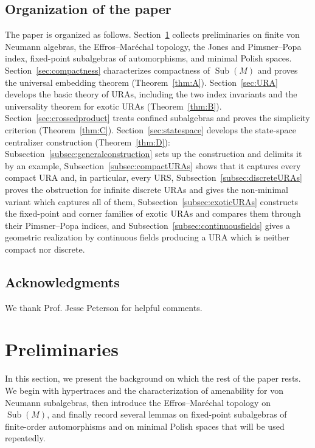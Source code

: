 \documentclass[12pt]{amsart} %
\theoremstyle{plain}
\theoremstyle{definition}
\DeclareMathOperator{\Sub}{Sub}
\begin{document}
\subsection*{Organization of the paper} The paper is organized as follows. Section~\ref{sec:preliminaries} collects preliminaries on finite von Neumann algebras, the Effros--Mar\'echal topology, the Jones and Pimsner--Popa index, fixed-point subalgebras of automorphisms, and minimal Polish spaces. Section~\ref{sec:compactness} characterizes compactness of $\Sub(M)$ and proves the universal embedding theorem (Theorem~\ref{thm:A}). Section~\ref{sec:URA} develops the basic theory of URAs, including the two index invariants and the universality theorem for exotic URAs (Theorem~\ref{thm:B}). Section~\ref{sec:crossedproduct} treats confined subalgebras and proves the simplicity criterion (Theorem~\ref{thm:C}). Section~\ref{sec:statespace} develops the state-space centralizer construction (Theorem~\ref{thm:D}): Subsection~\ref{subsec:generalconstruction} sets up the construction and delimits it by an example, Subsection~\ref{subsec:compactURAs} shows that it captures every compact URA and, in particular, every URS, Subsection~\ref{subsec:discreteURAs} proves the obstruction for infinite discrete URAs and gives the non-minimal variant which captures all of them, Subsection~\ref{subsec:exoticURAs} constructs the fixed-point and corner families of exotic URAs and compares them through their Pimsner--Popa indices, and Subsection~\ref{subsec:continuousfields} gives a geometric realization by continuous fields producing a URA which is neither compact nor discrete.
\subsection*{Acknowledgments} We thank Prof. Jesse Peterson for helpful comments.
\section{Preliminaries}
\label{sec:preliminaries}
In this section, we present the background on which the rest of the paper rests. We begin with hypertraces and the characterization of amenability for von Neumann subalgebras, then introduce the Effros--Mar\'echal topology on $\Sub(M)$, and finally record several lemmas on fixed-point subalgebras of finite-order automorphisms and on minimal Polish spaces that will be used repeatedly.
\end{document}

